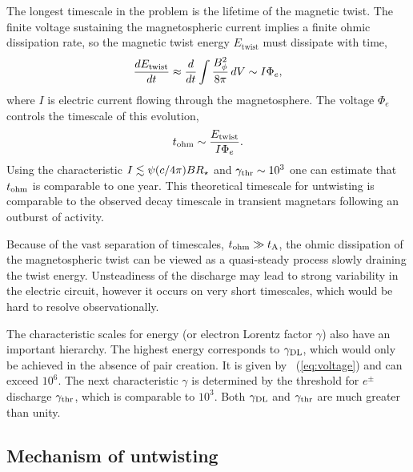 The longest timescale in the problem is the lifetime of the magnetic twist.
The finite voltage sustaining the magnetospheric current implies a finite ohmic
dissipation rate, so the magnetic twist energy $E_\mathrm{twist}$ must dissipate with time,
\begin{equation}
  \label{eq:11}
  \frac{dE_{\rm twist}}{dt}
  \approx
  \frac{d}{dt}\int\frac{B_{\phi}^2}{8\pi} \, dV \sim I\Phi_{e},
\end{equation}
where $I$ is electric current flowing through the magnetosphere.
The voltage $\Phi_e$ controls the timescale of this evolution,
\begin{equation}
  t_{\rm ohm}\sim \frac{E_{\rm twist}}{I\Phi_{e}}.
\end{equation}
Using the characteristic $I\lesssim \psi (c/4\pi)BR_\star$ and $\gamma_{\rm thr}\sim 10^3$ one
can estimate that $t_{\rm ohm}$ is comparable to one year. This theoretical timescale for
untwisting is comparable to the observed decay timescale in transient
magnetars following an outburst of activity.

Because of the vast separation of timescales, $t_{\rm ohm}\gg t_{\rm A}$, the ohmic dissipation
of the magnetospheric twist can be viewed as a quasi-steady process
slowly draining the twist energy. Unsteadiness of the discharge may lead to
strong variability in the electric circuit, however
it occurs
on very short timescales, which
would be hard to resolve observationally.

The characteristic scales for energy (or electron Lorentz factor $\gamma$) also have
an important hierarchy. The highest energy corresponds to $\gamma_{\rm DL}$, which would only
be achieved in the absence of pair creation.
It
is given by \Eq~(\ref{eq:voltage})
and can
exceed $10^6$. The next characteristic $\gamma$ is determined by the threshold for
$e^\pm$ discharge $\gamma_{\rm thr}$, which is comparable to $10^3$. Both $\gamma_{\rm DL}$ and $\gamma_{\rm thr}$
are much greater than unity.

\subsection{Mechanism of untwisting}
\label{sec:twist-theory}

